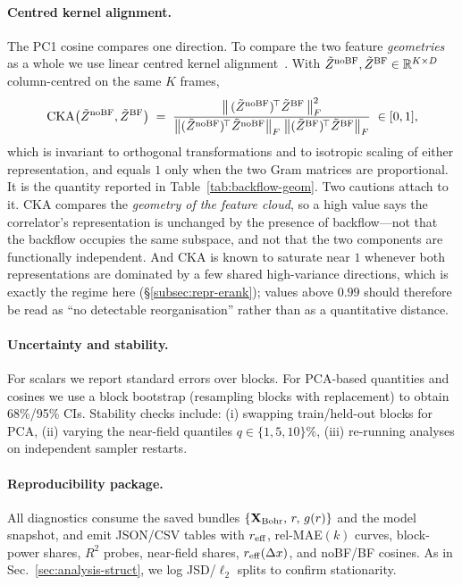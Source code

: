 \paragraph{Centred kernel alignment.}
The PC1 cosine compares one direction. To compare the two feature \emph{geometries} as a
whole we use linear centred kernel alignment~\cite{Kornblith2019-CKA}. With
$\tilde Z^{\rm noBF},\tilde Z^{\rm BF}\in\mathbb{R}^{K\times D}$ column-centred on the same
$K$ frames,
\begin{equation}
  \mathrm{CKA}\big(\tilde Z^{\rm noBF},\tilde Z^{\rm BF}\big)
  \;=\;
  \frac{\big\|\,(\tilde Z^{\rm noBF})^{\!\top}\tilde Z^{\rm BF}\,\big\|_F^{2}}
       {\big\|(\tilde Z^{\rm noBF})^{\!\top}\tilde Z^{\rm noBF}\big\|_F\;
        \big\|(\tilde Z^{\rm BF})^{\!\top}\tilde Z^{\rm BF}\big\|_F} \;\in[0,1],
  \label{eq:cka}
\end{equation}
which is invariant to orthogonal transformations and to isotropic scaling of either
representation, and equals $1$ only when the two Gram matrices are proportional. It is the
quantity reported in Table~\ref{tab:backflow-geom}. Two cautions attach to it. CKA compares
the \emph{geometry of the feature cloud}, so a high value says the correlator's
representation is unchanged by the presence of backflow---not that the backflow occupies the
same subspace, and not that the two components are functionally independent. And CKA is
known to saturate near $1$ whenever both representations are dominated by a few shared
high-variance directions, which is exactly the regime here
(\S\ref{subsec:repr-erank}); values above $0.99$ should therefore be read as ``no detectable
reorganisation'' rather than as a quantitative distance.

\paragraph{Uncertainty and stability.}
\label{subsec:repr-uncertainty}
For scalars we report standard errors over blocks.
For PCA-based quantities and cosines we use a block bootstrap (resampling blocks with replacement)
to obtain 68\%/95\% CIs. Stability checks include:
(i) swapping train/held-out blocks for PCA,
(ii) varying the near-field quantiles $q\in\{1,5,10\}\%$,
(iii) re-running analyses on independent sampler restarts.

\paragraph{Reproducibility package.}
All diagnostics consume the saved bundles
$\{\mathbf{X}_{\rm Bohr},\,r,\,g(r)\}$ and the model snapshot,
and emit JSON/CSV tables with $r_{\rm eff}$, rel-MAE$(k)$ curves, block-power shares,
$R^2$ probes, near-field shares, $r_{\rm eff}(\Delta x)$, and noBF/BF cosines.
As in Sec.~\ref{sec:analysis-struct}, we log JSD/$\ell_2$ splits to confirm stationarity.

